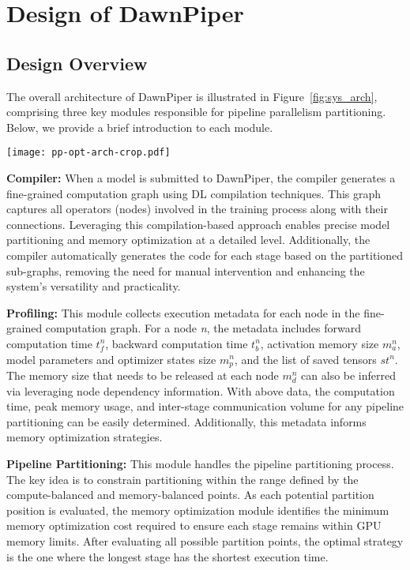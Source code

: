 \section{Design of DawnPiper}
\label{sec:design}
\subsection{Design Overview}
The overall architecture of DawnPiper is illustrated in Figure~\ref{fig:sys_arch},
comprising three key modules responsible for pipeline parallelism partitioning.
Below, we provide a brief introduction to each module.
\begin{figure*}
  \centering
  \texttt{[image: pp-opt-arch-crop.pdf]}
  \caption{DawnPiper System Architecture}
  \label{fig:sys_arch}
\end{figure*}

\textbf{Compiler:} When a model is submitted to DawnPiper,
the compiler generates a fine-grained computation graph using DL compilation techniques.
This graph captures all operators (nodes) involved in the training process along with their connections.
Leveraging this compilation-based approach enables precise model partitioning and memory optimization at a detailed level.
Additionally, the compiler automatically generates the code for each stage based on the partitioned sub-graphs,
removing the need for manual intervention and enhancing the system’s versatility and practicality.

\textbf{Profiling:} This module collects execution metadata for each node in the fine-grained computation graph.
For a node \emph{n}, the metadata includes forward computation time $t_f^n$,
backward computation time $t_b^n$, activation memory size $m_a^n$,
model parameters and optimizer states size $m_p^n$, and the list of saved tensors ${st}^n$.
The memory size that needs to be released at each node $m_d^n$ can also be inferred
via leveraging node dependency information.
With above data, the computation time, peak memory usage,
and inter-stage communication volume for any pipeline partitioning can be easily determined.
Additionally, this metadata informs memory optimization strategies.

\textbf{Pipeline Partitioning:} This module handles the pipeline partitioning process.
The key idea is to constrain partitioning within the range defined by the compute-balanced and memory-balanced points.
As each potential partition position is evaluated,
the memory optimization module identifies the minimum memory optimization cost
required to ensure each stage remains within GPU memory limits.
After evaluating all possible partition points,
the optimal strategy is the one where the longest stage has the shortest execution time.

